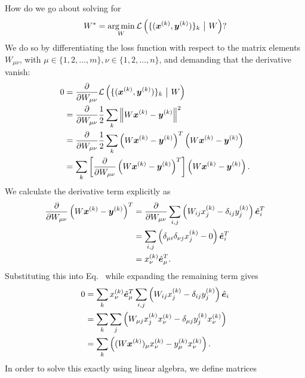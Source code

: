 \vspace{\baselineskip}
How do we go about solving for
%
\begin{equation}
    W^* = \operatorname*{arg\,min}_W \mathcal{L}\left(\{(\bm{x}^{(k)}, \bm{y}^{(k)})\}_k ~\big{|}~ W\right)?
\end{equation}
%
We do so by differentiating the loss function with respect to the matrix elements $W_{\mu\nu}$, with
$\mu \in \{1, 2, \dots, m\}, \nu \in \{1, 2, \dots, n\}$, and demanding that the derivative vanish:
%
\begin{align}
    \label{equation:l2-loss-minimization}
    0 &= \frac{\partial }{\partial W_{\mu\nu}} \mathcal{L}\left(\{(\bm{x}^{(k)}, \bm{y}^{(k)})\}_k ~\big{|}~ W\right) \nonumber\\
      &= \frac{\partial }{\partial W_{\mu\nu}} \frac{1}{2} \sum_k \left\|W \bm{x}^{(k)} - \bm{y}^{(k)} \right\|^2 \nonumber\\
      &= \frac{\partial }{\partial W_{\mu\nu}} \frac{1}{2} \sum_k \left(W \bm{x}^{(k)} - \bm{y}^{(k)} \right)^T \left(W \bm{x}^{(k)} - \bm{y}^{(k)} \right) \nonumber\\
      &= \sum_k \left[\frac{\partial }{\partial W_{\mu\nu}} \left(W \bm{x}^{(k)} - \bm{y}^{(k)} \right)^T \right] \left(W \bm{x}^{(k)} - \bm{y}^{(k)} \right).
\end{align}
%
We calculate the derivative term explicitly as
%
\begin{align}
    \frac{\partial }{\partial W_{\mu\nu}} \left(W \bm{x}^{(k)} - \bm{y}^{(k)} \right)^T &= \frac{\partial }{\partial W_{\mu\nu}} \sum_{i,j} \left(W_{ij} x^{(k)}_j - \delta_{ij} y^{(k)}_j \right)
                                                                 \hat{\bm{e}}^T_i \nonumber\\
        &= \sum_{i,j} \left(\delta_{\mu i} \delta_{\nu j} x^{(k)}_j - 0 \right) \hat{\bm{e}}^T_i \nonumber\\
        &= x^{(k)}_\nu \hat{\bm{e}}^T_\mu.
\end{align}
%
Substituting this into Eq.~ while expanding the remaining term gives
%
\begin{align}
    \label{equation:l2-loss-minimization-differentiated}
    0 &= \sum_k x^{(k)}_\nu \hat{\bm{e}}^T_\mu \sum_{i,j} \left(W_{ij} x^{(k)}_j - \delta_{ij} y^{(k)}_j \right) \hat{\bm{e}}_i \nonumber\\
      &= \sum_k \sum_{j} \left(W_{\mu j} x^{(k)}_j x^{(k)}_\nu - \delta_{\mu j} y^{(k)}_j x^{(k)}_\nu \right) \nonumber\\
      &= \sum_k \left((W \bm{x}^{(k)})_\mu x^{(k)}_\nu - y^{(k)}_\mu x^{(k)}_\nu \right).
\end{align}
%
In order to solve this exactly using linear algebra, we define matrices
